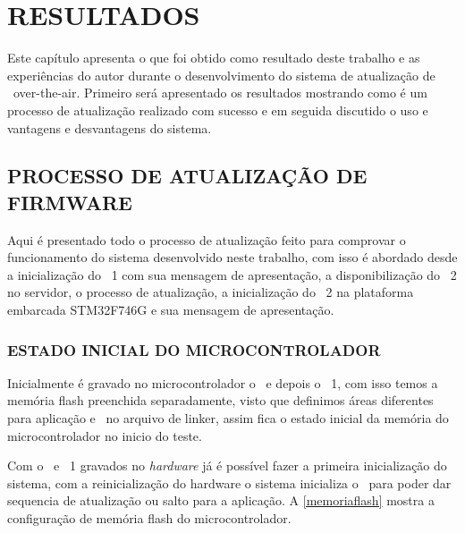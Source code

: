 \chapter{RESULTADOS}
\label{Chap:Resultados}

Este capítulo apresenta o que foi obtido como resultado deste trabalho e as experiências do autor durante o desenvolvimento do sistema de atualização de \firmware\ over-the-air. Primeiro será apresentado os resultados mostrando como é um processo de atualização realizado com sucesso e em seguida discutido o uso e vantagens e desvantagens do sistema. 

\section{PROCESSO DE ATUALIZAÇÃO DE FIRMWARE}
Aqui é presentado todo o processo de atualização feito para comprovar o funcionamento do sistema desenvolvido neste trabalho, com isso é abordado desde a inicialização do \firmware\ 1 com sua mensagem de apresentação, a disponibilização do \firmware\ 2 no servidor, o processo de atualização, a inicialização do \firmware\ 2 na plataforma embarcada STM32F746G e sua mensagem de apresentação.

\subsection{ESTADO INICIAL DO MICROCONTROLADOR}
Inicialmente é gravado no microcontrolador o \bootloader\ e depois o \firmware\ 1, com isso temos a memória flash preenchida separadamente, visto que definimos áreas diferentes para aplicação e \bootloader\ no arquivo de linker, assim fica o estado inicial da memória do microcontrolador no inicio do teste.

Com o \bootloader\ e \firmware\ 1 gravados no \textit{hardware} já é possível fazer a primeira inicialização do sistema, com a reinicialização do hardware o sistema inicializa o \bootloader\ para poder dar sequencia de atualização ou salto para a aplicação. A \autoref{memoriaflash} mostra a configuração de memória flash do microcontrolador.

